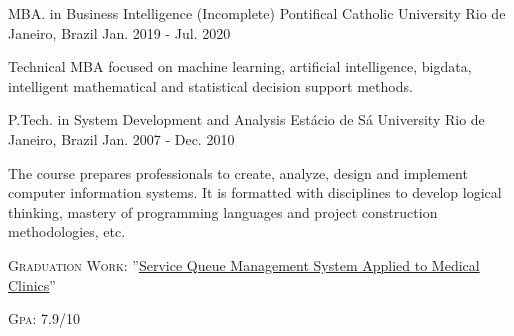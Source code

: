 

\begin{cventries}

  \cventry
    {MBA. in Business Intelligence (Incomplete)} %
    {Pontifical Catholic University} %
    {Rio de Janeiro, Brazil} %
    {Jan. 2019 - Jul. 2020} %
    {
      \begin{cvitems} %
        {Technical MBA focused on machine learning, artificial intelligence, bigdata, intelligent mathematical and statistical decision support methods.}
      \end{cvitems}
    }

  \cventry
    {P.Tech. in System Development and Analysis} %
    {Estácio de Sá University} %
    {Rio de Janeiro, Brazil} %
    {Jan. 2007 - Dec. 2010} %
    {
      \begin{cvitems} %
        {The course prepares professionals to create, analyze, design and implement computer information systems. It is formatted with disciplines to develop logical thinking, mastery of programming languages and project construction methodologies, etc.}
        \item {\textsc{Graduation Work}: ''\href{https://github.com/jfalves/camimsca}{Service Queue Management System Applied to Medical Clinics}''}
        \item {\textsc{Gpa}: 7.9/10}
      \end{cvitems}
    }

\end{cventries}
